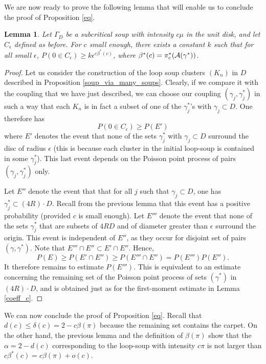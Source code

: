 \documentclass[11pt]{article}
\newtheorem {lemma} [Theorem]    {Lemma}
\newcommand{\eps}{\epsilon}
\newcommand{\PP}{{ P}}
\begin{document}
We are now ready to prove the following lemma that will enable us to conclude the proof 
of Proposition \ref {eq}. 

\begin {lemma}
Let $\Gamma_D$ be a subcritical soup with intensity $c \mu$ in the unit disk, 
and let $C_\eps$ defined as before. For $c$ small enough, 
there exists  a constant $k$ such that for all small $\eps$,
$\PP ( 0 \in C_\eps) \ge 
 k \eps^{c\beta^*(c)}$,
 where $\beta^* (c)=  \pi_c^* ( {\cal A} ( \gamma^*) )$.
\end{lemma}

\begin {proof}
Let us consider the construction of the loop soup clusters $(K_n)$ in $D$ described in Proposition \ref {soup_via_many_soups}. Clearly, if we compare it with the 
coupling that we have just described, we can choose our coupling  $(\gamma_j, \gamma_j^*)$ in such a way that each $K_n$ is in fact a subset of one of the $\gamma_j^*$'s with $\gamma_j \subset D$. 
 One therefore has 
 $$ 
 P ( 0 \in C_\eps ) \ge P ( E') 
 $$
 where $E'$ denotes the event that none of the sets $\gamma_j^*$ with $\gamma_j \subset D$ surround the disc of radius $\eps$ 
(this is because each cluster in the initial loop-soup is contained in some $\gamma_j^*$).
 This last event depends on the Poisson point process of pairs $(\gamma_j, \gamma_j^*)$ only.
 
 
Let $E''$ denote the event that
 that for all $j$ such that $\gamma_j \subset D$, one has 
$\gamma_j^* \subset (4R) \cdot D$. Recall from the previous lemma that this event has a positive probability (provided $c$ is small enough).
 Let $E'''$ denote the event that none of the sets $\gamma_j^*$ that are subsets of $4RD$ and of diameter greater than $\eps$ surround the origin.
 This event is independent of $E''$, as they occur for disjoint set of pairs $(\gamma, \gamma^*)$. Note that $E''' \cap E'' \subset E' \cap E''$. Hence, 
 $$ P(E) \ge P ( E' \cap E'') \ge P (E''' \cap E'')  = P( E''') P (E'') .
 $$
 It therefore remains to estimate $P(E''')$. This is equivalent to 
an estimate concerning the remaining set of the Poisson point process of 
 sets $(\gamma^*)$ in $(4R) \cdot D$, and is obtained 
just as for the first-moment estimate in Lemma \ref{coeff_c}.  
 \end {proof}
 
We can now conclude the proof of Proposition \ref {eq}. Recall that $d(c) \le \delta (c ) = 2 - c \beta (\pi)$ because the remaining set contains the carpet. On the other hand, 
the previous lemma and the definition of $\beta (\pi)$ show that the $\alpha = 2 - d(c)$ corresponding to the loop-soup with intensity $c\pi$ is not larger than $c \beta^*(c) = c \beta(\pi) + o (c)$.
 
\end{document}
